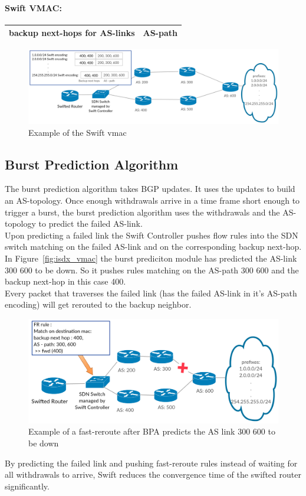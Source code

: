 \paragraph{\label{chapter2:Swift:Swift vmac}Swift VMAC:}

\begin{tabular}{|r|l|}
  \hline 
  backup next-hops for AS-links & AS-path \\
  \hline
\end{tabular}


\begin{figure}[h]
\center
\includegraphics[scale = 0.24]{Figures/bckgrnd_swift_topology.pdf}
\caption{Example of the Swift vmac}
\label{fig:swift_vmac}
\end{figure}


\subsection{\label{chapter2:Swift:burst prediciton algorithm}Burst Prediction Algorithm}
The burst prediction algorithm takes BGP updates. It uses the updates to build an AS-topology. Once enough withdrawals arrive in a time frame short enough to trigger a burst, the burst prediction algorithm uses the withdrawals and the AS-topology to predict the failed AS-link. \\
Upon predicting a failed link the Swift Controller pushes flow rules into the SDN switch matching on the failed AS-link and on the corresponding backup next-hop. In Figure~\ref{fig:isdx_vmac} the burst prediciton module has predicted the AS-link 300 600 to be down. So it pushes rules matching on the AS-path 300 600 and the backup next-hop in this case 400.\\
Every packet that traverses the failed link (has the failed AS-link in it's AS-path encoding) will get rerouted to the backup neighbor.
\begin{figure}[h]
\center
\includegraphics[scale = 0.36]{Figures/bckgrnd_swift_fr.pdf}
\caption{Example of a fast-reroute after BPA predicts the AS link 300 600 to be down}
\label{fig:swift_FR}
\end{figure}

By predicting the failed link and pushing fast-reroute rules instead of waiting for all withdrawals to arrive, Swift reduces the convergence time of the swifted router significantly.





